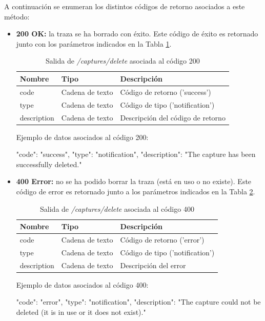 A continuación se enumeran los distintos códigos de retorno asociados a este método:
\begin{itemize}

\item{\textbf{200 OK:} la \gls{traza} se ha borrado con éxito. Este código de éxito es retornado junto con los parámetros indicados en la Tabla \ref{extra:api:capturesdelete:ok}.
\begin{table}[H]
\centering
\begin{tabular}{|l|l|l|}
\hline
\rowcolor[HTML]{F5F5F5}
\textbf{Nombre}  & \textbf{Tipo}   & \textbf{Descripción}              \\ \hline
code             & Cadena de texto & Código de retorno ('success')     \\ \hline
type             & Cadena de texto & Código de tipo ('notification')   \\ \hline
description      & Cadena de texto & Descripción del código de retorno \\ \hline
\end{tabular}
\caption{Salida de \textit{/captures/delete} asociada al código 200}
\label{extra:api:capturesdelete:ok}
\end{table}
\begin{minipage}{\textwidth}
Ejemplo de datos asociados al código 200:

\begin{code}[language=json]
{
  "code": "success",
  "type": "notification",
  "description": "The capture has been successfully deleted."
}
\end{code}
\end{minipage}
}

\item{\textbf{400 Error:} no se ha podido borrar la \gls{traza} (está en uso o no existe). Este código de error es retornado junto a los parámetros indicados en la Tabla \ref{extra:api:capturesdelete:error}.
\begin{table}[H]
\centering
\begin{tabular}{|l|l|l|}
\hline
\rowcolor[HTML]{F5F5F5}
\textbf{Nombre}  & \textbf{Tipo}   & \textbf{Descripción}            \\ \hline
code             & Cadena de texto & Código de retorno ('error')     \\ \hline
type             & Cadena de texto & Código de tipo ('notification') \\ \hline
description      & Cadena de texto & Descripción del error           \\ \hline
\end{tabular}
\caption{Salida de \textit{/captures/delete} asociada al código 400}
\label{extra:api:capturesdelete:error}
\end{table}
\begin{minipage}{\textwidth}
Ejemplo de datos asociados al código 400:

\begin{code}[language=json]
{
  "code": "error",
  "type": "notification",
  "description": "The capture could not be deleted (it is in use or it does not exist)."
}
\end{code}
\end{minipage}
}
\end{itemize}